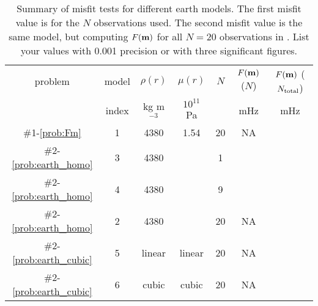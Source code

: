 \documentclass[11pt,titlepage,fleqn]{article}
\begin{document}
\begin{table}
\centering
\caption[]
{{
Summary of misfit tests for different earth models.
The first misfit value is for the $N$ observations used.
The second misfit value is the same model, but computing $F(\mbox{${\bf m}$})$ for all $N=20$ observations in . List your values with 0.001 precision or with three significant figures.
\label{tab:homo}
}}
\begin{spacing}{1.5}
\begin{tabular}{||c|c|c|c|c|c||c|}
\hline
problem & model & $\rho(r)$ & $\mu(r)$ & $N$ & $F(\mbox{${\bf m}$})$ ($N$) & $F(\mbox{${\bf m}$})$ ($N_{\rm total}$) \\
& index & kg m$^{-3}$ & $10^{11}$ Pa & & mHz & mHz \\ \hline\hline
$\#$1-\ref{prob:Fm} & 1 & 4380 & 1.54 & 20 & NA &  \\  \hline
$\#$2-\ref{prob:earth_homo} & 3 & 4380 &      & 1  &  &  \\  \hline
$\#$2-\ref{prob:earth_homo} & 4 & 4380 &      & 9  &  &  \\  \hline
\hline
$\#$2-\ref{prob:earth_homo} & 2 & 4380 &      & 20 & NA  &  \\  \hline
$\#$2-\ref{prob:earth_cubic} & 5 & linear & linear & 20 & NA  & \\ \hline
$\#$2-\ref{prob:earth_cubic} & 6 & cubic & cubic & 20 & NA  & \\ \hline
\hline
\end{tabular}
\end{spacing}
\end{table}

\end{document}
